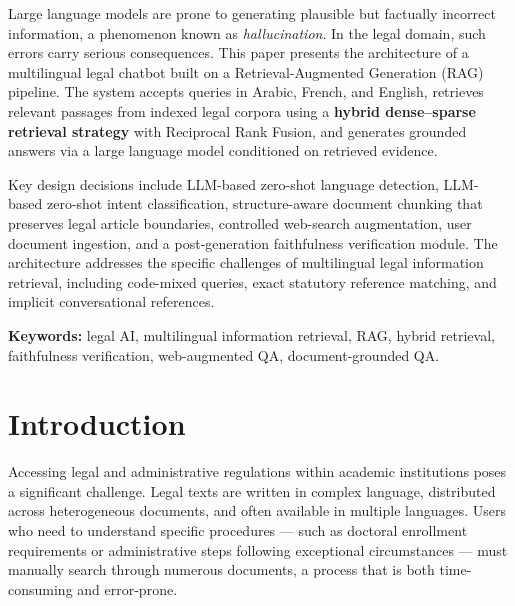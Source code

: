 \documentclass[12pt, a4paper]{article}
\begin{document}
\begin{tcolorbox}[
  colback=lightblue, colframe=primary, arc=4pt, boxrule=1pt,
  title={\bfseries\color{white} Abstract}, fonttitle=\normalsize,
  left=12pt, right=12pt, top=10pt, bottom=10pt
]
\color{darkgray}
Large language models are prone to generating plausible but factually incorrect
information, a phenomenon known as \textit{hallucination}. In the legal domain, such errors
carry serious consequences. This paper presents the architecture of a multilingual
legal chatbot built on a Retrieval-Augmented Generation (RAG) pipeline. The system
accepts queries in Arabic, French, and English, retrieves relevant passages from
indexed legal corpora using a \textbf{hybrid dense--sparse retrieval strategy} with Reciprocal
Rank Fusion, and generates grounded answers via a large language model conditioned
on retrieved evidence.

Key design decisions include LLM-based zero-shot language detection, LLM-based
zero-shot intent classification, structure-aware document chunking that preserves
legal article boundaries, controlled web-search augmentation, user document ingestion,
and a post-generation faithfulness verification module. The architecture addresses
the specific challenges of multilingual legal information retrieval, including
code-mixed queries, exact statutory reference matching, and implicit conversational
references.

\medskip
\textbf{\color{primary}Keywords:} legal AI,\; multilingual information retrieval,\; RAG,\;
hybrid retrieval,\; faithfulness verification,\; web-augmented QA,\; document-grounded QA.
\end{tcolorbox}

\vspace{1.5cm}
\tableofcontents

\newpage

\section{Introduction}

Accessing legal and administrative regulations within academic institutions poses
a significant challenge. Legal texts are written in complex language, distributed
across heterogeneous documents, and often available in multiple languages.
Users who need to understand specific procedures --- such as doctoral enrollment
requirements or administrative steps following exceptional circumstances ---
must manually search through numerous documents, a process that is both
time-consuming and error-prone.
\end{document}
